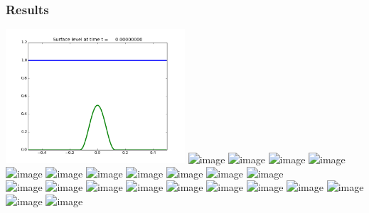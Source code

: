 \documentclass{beamer}
\begin{document}
\begin{frame}
  \frametitle{Results}
  \begin{center}
    \includegraphics[width=0.5\textwidth]{../results/still-cosine-initial.png}
    \includegraphics<1>[width=0.5\textwidth]{../results/still-cosine-unbalanced-01.png}
    \includegraphics<2>[width=0.5\textwidth]{../results/still-cosine-unbalanced-02.png}
    \includegraphics<3>[width=0.5\textwidth]{../results/still-cosine-unbalanced-03.png}
    \includegraphics<4>[width=0.5\textwidth]{../results/still-cosine-unbalanced-04.png}
    \includegraphics<5>[width=0.5\textwidth]{../results/still-cosine-unbalanced-05.png}
    \includegraphics<6>[width=0.5\textwidth]{../results/still-cosine-unbalanced-06.png}
    \includegraphics<7>[width=0.5\textwidth]{../results/still-cosine-unbalanced-07.png}
    \includegraphics<8>[width=0.5\textwidth]{../results/still-cosine-unbalanced-08.png}
    \includegraphics<9>[width=0.5\textwidth]{../results/still-cosine-unbalanced-09.png}
    \includegraphics<10>[width=0.5\textwidth]{../results/still-cosine-unbalanced-10.png}
    \includegraphics<11>[width=0.5\textwidth]{../results/still-cosine-unbalanced-11.png} \\
    \includegraphics<1>[width=0.5\textwidth]{../results/still-cosine-leveque-01.png}
    \includegraphics<2>[width=0.5\textwidth]{../results/still-cosine-leveque-02.png}
    \includegraphics<3>[width=0.5\textwidth]{../results/still-cosine-leveque-03.png}
    \includegraphics<4>[width=0.5\textwidth]{../results/still-cosine-leveque-04.png}
    \includegraphics<5>[width=0.5\textwidth]{../results/still-cosine-leveque-05.png}
    \includegraphics<6>[width=0.5\textwidth]{../results/still-cosine-leveque-06.png}
    \includegraphics<7>[width=0.5\textwidth]{../results/still-cosine-leveque-07.png}
    \includegraphics<8>[width=0.5\textwidth]{../results/still-cosine-leveque-08.png}
    \includegraphics<9>[width=0.5\textwidth]{../results/still-cosine-leveque-09.png}
    \includegraphics<10>[width=0.5\textwidth]{../results/still-cosine-leveque-10.png}
    \includegraphics<11>[width=0.5\textwidth]{../results/still-cosine-leveque-11.png} \\
  \end{center}
\end{frame}



\end{document}
